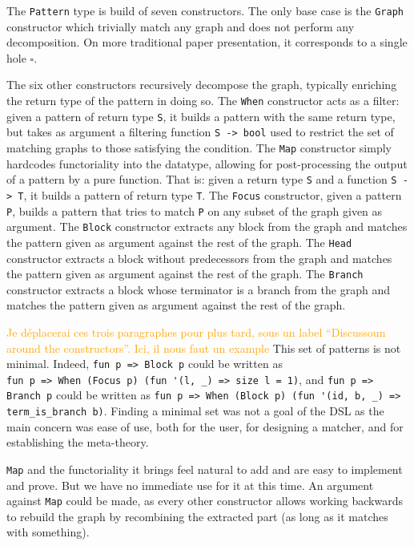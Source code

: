 \documentclass[11pt]{article}
\newcommand{\inlinecoq}[1]{\mbox{\lstinline[style=customcoq,columns=fixed,basewidth=.48em]{#1}}}
\newcommand{\ilc}[1]{\inlinecoq{#1}}
\newcommand{\gr}[1]{\textcolor{Orange}{#1}}
\begin{document}
The \ilc{Pattern} type is build of seven constructors. The only base case is the \ilc{Graph} constructor which trivially match any graph and does not perform any decomposition. On more traditional paper presentation, it corresponds to a single hole $\square$.

The six other constructors recursively decompose the graph, typically enriching the return type of the pattern in doing so. 
The \ilc{When} constructor acts as a filter:
given a pattern of return type \ilc{S}, it builds a pattern with the same return type, but takes as argument a filtering function \ilc{S -> bool} used to restrict the set of matching graphs to those satisfying the condition.
The \ilc{Map} constructor simply hardcodes functoriality into the datatype, allowing for post-processing the output of a pattern by a pure function. That is: given a return type \ilc{S} and a function \ilc{S -> T}, it builds a pattern of return type \ilc{T}.
The \ilc{Focus} constructor, given a pattern \ilc{P}, builds a pattern that tries to match \ilc{P} on any subset of the graph given as argument.
The \ilc{Block} constructor extracts any block from the graph and matches the pattern given as argument against the rest of the graph.
The \ilc{Head} constructor extracts a block without predecessors from the graph and matches the pattern given as argument against the rest of the graph.
The \ilc{Branch} constructor extracts a block whose terminator is a branch from the graph and matches the pattern given as argument against the rest of the graph.


\gr{Je déplacerai ces trois paragraphes pour plus tard, sous un label ``Discussoun around the constructors''. Ici, il nous faut un example}
This set of patterns is not minimal. Indeed, \ilc{fun p => Block p} could be written as\\\ilc{fun p => When (Focus p) (fun '(l, _) => size l = 1)}, and \ilc{fun p => Branch p} could be written as \ilc{fun p => When (Block p) (fun '(id, b, _) => term_is_branch b)}. Finding a minimal set was not a goal of the DSL as the main concern was ease of use, both for the user, for designing a matcher, and for establishing the meta-theory. 

\ilc{Map} and the functoriality it brings feel natural to add and are easy to implement and prove. But we have no immediate use for it at this time. An argument against \ilc{Map} could be made, as every other constructor allows working backwards to rebuild the graph by recombining the extracted part (as long as it matches with something).
\end{document}
